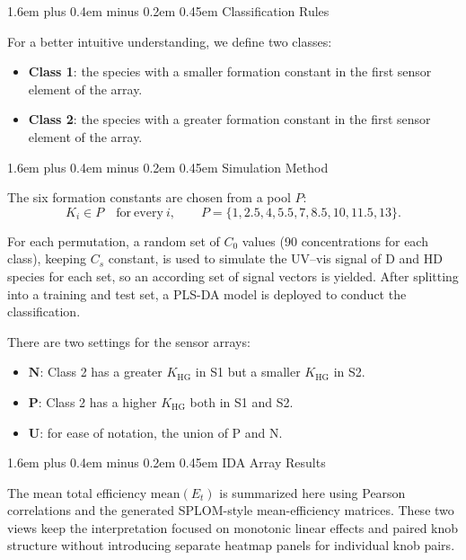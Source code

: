 \documentclass[11pt]{article}
\makeatletter
\newcommand{\KHG}{K_{\mathrm{HG}}}
\newcommand{\Et}{E_t}
\renewcommand\section{\@startsection{section}{1}{0pt}%
    {1.6em plus 0.4em minus 0.2em}%
    {0.45em}%
    {\normalfont\Large\bfseries\color{reportblue}}}
\makeatother
\begin{document}
\section{Classification Rules}

For a better intuitive understanding, we define two classes:
\begin{itemize}
    \item \textbf{Class 1}: the species with a smaller formation constant in the
    first sensor element of the array.
    \item \textbf{Class 2}: the species with a greater formation constant in the
    first sensor element of the array.
\end{itemize}

\section{Simulation Method}

The six formation constants are chosen from a pool $P$:
\[
K_i \in P \quad \mathrm{for\ every}\ i,\qquad
P=\{1,2.5,4,5.5,7,8.5,10,11.5,13\}.
\]

For each permutation, a random set of $C_0$ values (90 concentrations for each
class), keeping $C_s$ constant, is used to simulate the UV--vis signal of D and
HD species for each set, so an according set of signal vectors is yielded. After
splitting into a training and test set, a PLS-DA model is deployed to conduct the
classification.

There are two settings for the sensor arrays:
\begin{itemize}
    \item $\mathbf{N}$: Class 2 has a greater $\KHG$ in S1 but a smaller $\KHG$
    in S2.
    \item $\mathbf{P}$: Class 2 has a higher $\KHG$ both in S1 and S2.
    \item $\mathbf{U}$: for ease of notation, the union of P and N.
\end{itemize}

\section{IDA Array Results}

The mean total efficiency $\mathrm{mean}(\Et)$ is summarized here using Pearson
correlations and the generated SPLOM-style mean-efficiency matrices. These two
views keep the interpretation focused on monotonic linear effects and paired knob
structure without introducing separate heatmap panels for individual knob pairs.
\end{document}
